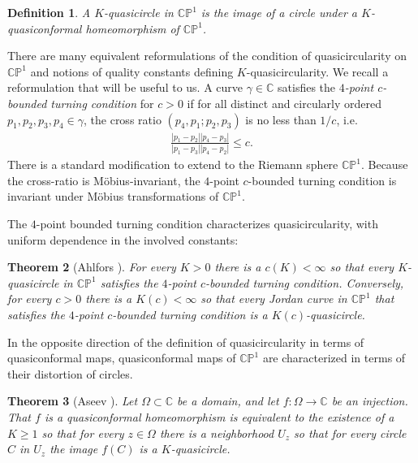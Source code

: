 \documentclass[12pt,a4paper]{amsart}
\newcommand{\bbC}{\mathbb C}
\newcommand{\CP}{\mathbb{CP}}
\theoremstyle{definition}
\theoremstyle{plain}
\newtheorem{theorem}{Theorem}[section]
\newtheorem{definition}[theorem]{Definition}
\numberwithin{equation}{section}
\begin{document}
\begin{definition}
    A $K$-quasicircle in $\CP^1$ is the image of a circle under a $K$-quasiconformal homeomorphism of $\CP^1$.
\end{definition}

There are many equivalent reformulations of the condition of quasicircularity on $\CP^1$ and notions of quality constants defining $K$-quasicircularity.
We recall a reformulation that will be useful to us.
A curve $\gamma \in \bbC$ satisfies the \textit{$4$-point $c$-bounded turning condition} for $c > 0$ if for all distinct and circularly ordered $p_1, p_2, p_3, p_4 \in \gamma$, the cross ratio $(p_4, p_1; p_2,p_3)$ is no less than $1/c$, i.e. \begin{align*}
    \frac{| p_1 - p_2| | p_4 - p_3 |}{|p_1 - p_3| |p_4 - p_2|} \leq c.
\end{align*}
There is a standard modification to extend to the Riemann sphere $\CP^1$.
Because the cross-ratio is M\"obius-invariant, the $4$-point $c$-bounded turning condition is invariant under M\"obius transformations of $\CP^1$.

The $4$-point bounded turning condition characterizes quasicircularity, with uniform dependence in the involved constants:

\begin{theorem}[Ahlfors {\cite[Theorem 1]{ahlfors1963quasiconformal}}]
    For every $K > 0$ there is a $c(K) < \infty$ so that every $K$-quasicircle in $\CP^1$ satisfies the $4$-point $c$-bounded turning condition.
    Conversely, for every $c > 0$ there is a $K(c) < \infty$ so that every Jordan curve in $\CP^1$ that satisfies the $4$-point $c$-bounded turning condition is a $K(c)$-quasicircle.
\end{theorem}

In the opposite direction of the definition of quasicircularity in terms of quasiconformal maps, quasiconformal maps of $\CP^1$ are characterized in terms of their distortion of circles.

\begin{theorem}[Aseev \cite{aseev2014quasiconformal}]\label{thm-aseev}
    Let $\Omega \subset \bbC$ be a domain, and let $f: \Omega \to \bbC$ be an injection.
    That $f$ is a quasiconformal homeomorphism is equivalent to the existence of a $K \geq 1$ so that for every $z \in \Omega$ there is a neighborhood $U_{z}$ so that for every circle $C$ in $U_z$ the image $f(C)$ is a $K$-quasicircle.
\end{theorem}
\end{document}
